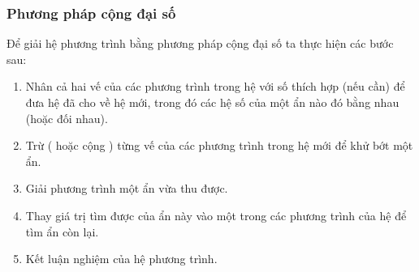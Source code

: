\subsubsection{Phương pháp cộng đại số}
Để giải hệ phương trình bằng phương pháp cộng đại số ta thực hiện các bước sau:
\begin{enumerate}
	\item Nhân cả hai vế của các phương trình trong hệ với số thích hợp (nếu cần) để đưa hệ đã cho về hệ mới, trong đó các hệ số của một ẩn nào đó bằng nhau (hoặc đối nhau).
	\item Trừ ( hoặc cộng ) từng vế của các phương trình trong hệ mới để khử bớt một ẩn.
	\item Giải phương trình một ẩn vừa thu được.
	\item Thay giá trị tìm được của ẩn này vào một trong các phương trình của	hệ để tìm ẩn còn lại.
	\item Kết luận nghiệm của hệ phương trình.
\end{enumerate}
